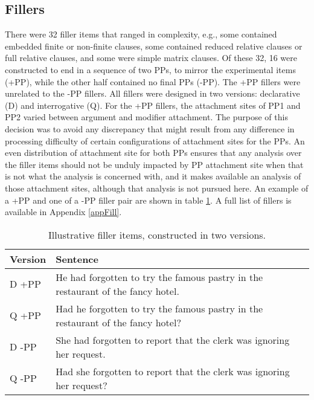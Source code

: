 \documentclass[11pt,oneside]{book}
\begin{document}
\hypertarget{fillers}{%
\subsection{Fillers}\label{fillers}}

There were 32 filler items that ranged in complexity, e.g., some contained embedded finite or non-finite clauses, some contained reduced relative clauses or full relative clauses, and some were simple matrix clauses. Of these 32, 16 were constructed to end in a sequence of two PPs, to mirror the experimental items (+PP), while the other half contained no final PPs (-PP). The +PP fillers were unrelated to the -PP fillers. All fillers were designed in two versions: declarative (D) and interrogative (Q). For the +PP fillers, the attachment sites of PP1 and PP2 varied between argument and modifier attachment. The purpose of this decision was to avoid any discrepancy that might result from any difference in processing difficulty of certain configurations of attachment sites for the PPs. An even distribution of attachment site for both PPs ensures that any analysis over the filler items should not be unduly impacted by PP attachment site when that is not what the analysis is concerned with, and it makes available an analysis of those attachment sites, although that analysis is not pursued here. An example of a +PP and one of a -PP filler pair are shown in table \ref{tab:fsentences}. A full list of fillers is available in Appendix \ref{appFill}.

\begin{table}[!h]

\caption{\label{tab:fsentences}Illustrative filler items, constructed in two versions.}
\centering
\begin{tabular}{ll}
\toprule
Version & Sentence\\
\midrule
D +PP & He had forgotten to try the famous pastry in the restaurant of the fancy hotel.\\
Q +PP & Had he forgotten to try the famous pastry in the restaurant of the fancy hotel?\\
\hline
\addlinespace
D -PP & She had forgotten to report that the clerk was ignoring her request.\\
Q -PP & Had she forgotten to report that the clerk was ignoring her request?\\
\bottomrule
\end{tabular}
\end{table}
\end{document}
